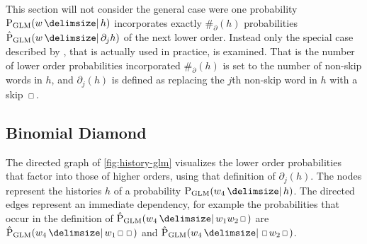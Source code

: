 This section will not consider the general case were one probability
$\ProbGLM{w}{h}$ incorporates exactly $\#_\partial(h)$ probabilities
$\ProbGLM*{w}{\partial_j h}$ of the next lower order.
Instead only the special case described by \textcite{Pickhardt2014}, that is
actually used in practice, is examined.
That is the number of lower order probabilities incorporated $\#_\partial(h)$
is set to the number of non-skip words in $h$, and $\partial_j(h)$ is defined as
replacing the $j$th non-skip word in $h$ with a skip $\Skp$.

\subsection{Binomial Diamond}


The directed graph of \cref{fig:history-glm} visualizes the lower order
probabilities that factor into those of higher orders, using that definition of
$\partial_j(h)$.
The nodes represent the histories $h$ of a probability $\ProbGLM{w_4}{h}$.
The directed edges represent an immediate dependency, for example the
probabilities that occur in the definition of
$\ProbGLM*{w_4}{w_1 w_2 \Skp}$ are $\ProbGLM*{w_4}{w_1 \Skp \Skp}$ and
$\ProbGLM*{w_4}{\Skp w_2 \Skp}$.

